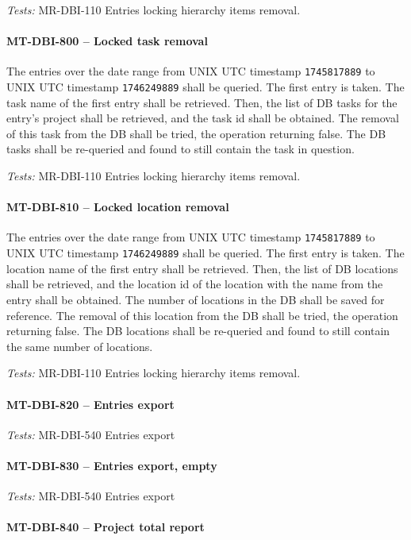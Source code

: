 \textit{Tests: } MR-DBI-110 Entries locking hierarchy items removal.

\paragraph{MT-DBI-800 -- Locked task removal}
The entries over the date range from UNIX UTC timestamp
\lstinline{1745817889} to UNIX UTC timestamp \lstinline{1746249889}
shall be queried. The first entry is taken.
The task name of the first entry shall be retrieved.
Then, the list of DB tasks for the entry's project shall be retrieved, and the
task id shall be obtained.
The removal of this task from the DB shall be tried, the operation
returning false. The DB tasks shall be re-queried and found to still
contain the task in question.

\textit{Tests: } MR-DBI-110 Entries locking hierarchy items removal.

\paragraph{MT-DBI-810 -- Locked location removal}
The entries over the date range from UNIX UTC timestamp
\lstinline{1745817889} to UNIX UTC timestamp \lstinline{1746249889}
shall be queried. The first entry is taken.
The location name of the first entry shall be retrieved.
Then, the list of DB locations shall be retrieved, and the location
id of the location with the name from the entry shall be obtained.
The number of locations in the DB shall be saved for reference.
The removal of this location from the DB shall be tried, the operation
returning false. The DB locations shall be re-queried and found to still
contain the same number of locations.

\textit{Tests: } MR-DBI-110 Entries locking hierarchy items removal.

\paragraph{MT-DBI-820 -- Entries export}

\textit{Tests: } MR-DBI-540 Entries export

\paragraph{MT-DBI-830 -- Entries export, empty}

\textit{Tests: } MR-DBI-540 Entries export

\paragraph{MT-DBI-840 -- Project total report}


